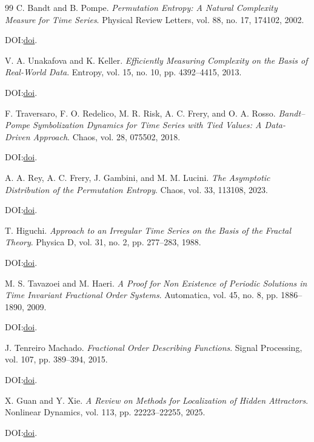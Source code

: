 \documentclass[11pt]{article}
\begin{document}
\begin{thebibliography}{99}
C. Bandt and B. Pompe.
\emph{Permutation Entropy: A Natural Complexity Measure for Time Series}.
Physical Review Letters, vol. 88, no. 17, 174102, 2002.
\par\noindent DOI:\@ \href{https://doi.org/10.1103/PhysRevLett.88.174102}{doi}.

V. A. Unakafova and K. Keller.
\emph{Efficiently Measuring Complexity on the Basis of Real-World Data}.
Entropy, vol. 15, no. 10, pp. 4392--4415, 2013.
\par\noindent DOI:\@ \href{https://doi.org/10.3390/e15104392}{doi}.

F. Traversaro, F. O. Redelico, M. R. Risk, A. C. Frery, and O. A. Rosso.
\emph{Bandt--Pompe Symbolization Dynamics for Time Series with Tied Values:
A Data-Driven Approach}.
Chaos, vol. 28, 075502, 2018.
\par\noindent DOI:\@ \href{https://doi.org/10.1063/1.5022021}{doi}.

A. A. Rey, A. C. Frery, J. Gambini, and M. M. Lucini.
\emph{The Asymptotic Distribution of the Permutation Entropy}.
Chaos, vol. 33, 113108, 2023.
\par\noindent DOI:\@ \href{https://doi.org/10.1063/5.0171508}{doi}.

T. Higuchi.
\emph{Approach to an Irregular Time Series on the Basis of the Fractal Theory}.
Physica D, vol. 31, no. 2, pp. 277--283, 1988.
\par\noindent DOI:\@ \href{https://doi.org/10.1016/0167-2789(88)90081-4}{doi}.

M. S. Tavazoei and M. Haeri.
\emph{A Proof for Non Existence of Periodic Solutions in Time Invariant Fractional Order Systems}.
Automatica, vol. 45, no. 8, pp. 1886--1890, 2009.
\par\noindent DOI:\@ \href{https://doi.org/10.1016/j.automatica.2009.04.001}{doi}.

J. Tenreiro Machado.
\emph{Fractional Order Describing Functions}.
Signal Processing, vol. 107, pp. 389--394, 2015.
\par\noindent DOI:\@ \href{https://doi.org/10.1016/j.sigpro.2014.05.012}{doi}.

X. Guan and Y. Xie.
\emph{A Review on Methods for Localization of Hidden Attractors}.
Nonlinear Dynamics, vol. 113, pp. 22223--22255, 2025.
\par\noindent DOI:\@ \href{https://doi.org/10.1007/s11071-025-11327-5}{doi}.


\end{thebibliography}
\end{document}
